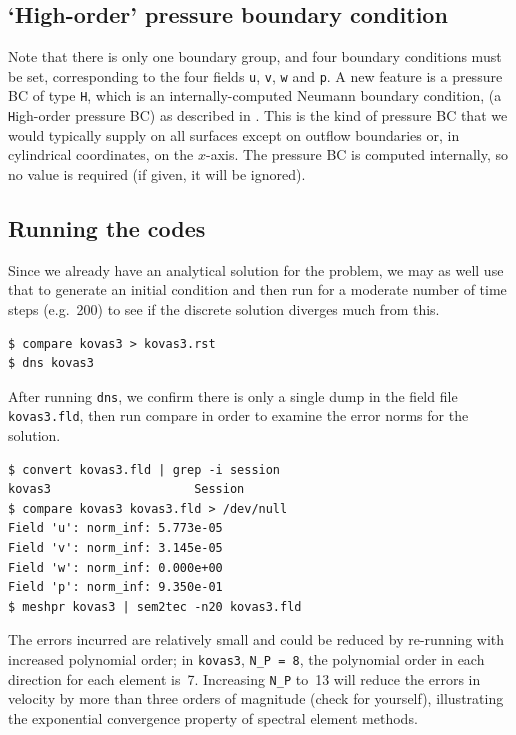 \documentclass[11pt]{report}
\newcommand{\eg}{e.g.\ } \newcommand{\CC}{\mathrm{c.c.}}
\begin{document}
\subsection{`High-order' pressure boundary condition}

Note that there is only one boundary group, and four boundary
conditions must be set, corresponding to the four fields \verb+u+,
\verb+v+, \verb+w+ and \verb+p+.  A new feature is a pressure BC of
type \verb+H+, which is an internally-computed Neumann boundary
condition, (a \verb+H+igh-order pressure BC) as described in
\citet{kio91}.  This is the kind of pressure BC that we would
typically supply on all surfaces except on outflow boundaries or, in
cylindrical coordinates, on the $x$-axis.  The pressure BC is computed
internally, so no value is required (if given, it will be ignored).

\subsection{Running the codes}

Since we already have an analytical solution for the problem, we may
as well use that to generate an initial condition and then run for a
moderate number of time steps (\eg 200) to see if the discrete
solution diverges much from this.
{\small
\begin{verbatim}
$ compare kovas3 > kovas3.rst
$ dns kovas3
\end{verbatim}
}

After running \verb+dns+, we confirm there is only a single dump in the
field file \verb+kovas3.fld+, then run compare in order to examine the
error norms for the solution.
%
{\small
\begin{verbatim}
$ convert kovas3.fld | grep -i session
kovas3                    Session
$ compare kovas3 kovas3.fld > /dev/null
Field 'u': norm_inf: 5.773e-05
Field 'v': norm_inf: 3.145e-05
Field 'w': norm_inf: 0.000e+00
Field 'p': norm_inf: 9.350e-01
$ meshpr kovas3 | sem2tec -n20 kovas3.fld
\end{verbatim}
}
%
The errors incurred are relatively small and could be reduced by
re-running with increased polynomial order; in \verb|kovas3|,
\verb|N_P = 8|, \ie the polynomial order in each direction for each
element is~7.  Increasing \verb|N_P| to~13 will reduce the errors in
velocity by more than three orders of magnitude (check for yourself),
illustrating the exponential convergence property of spectral element
methods.
\end{document}
